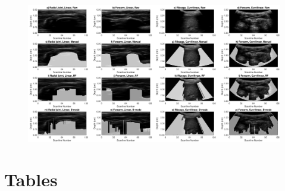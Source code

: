 \documentclass[preprint,5p,authoryear]{elsarticle}
\begin{document}
\begin{figure}
	\centering
	\includegraphics[scale=0.55]{fig1.pdf}
\end{figure}





\pagebreak

\section*{Tables}
\end{document}
